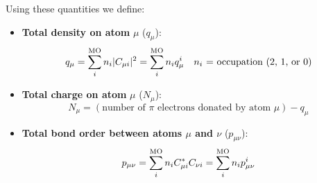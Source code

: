 \documentclass[../Main/chem532-notes.tex]{subfiles}
\begin{document}
%
%
%


Using these quantities we define:
\begin{itemize}
\item \textbf{Total density on atom} $\mu$ ($q_\mu$):
\begin{equation}
q_\mu = \sum_{i}^{\rm MO} n_i |C_{\mu i}|^2 = \sum_{i}^{\rm MO} n_i q_\mu^i \quad n_i \text{ = occupation (2, 1, or 0)} 
\end{equation}

\item \textbf{Total charge on atom} $\mu$ ($N_\mu$):
\begin{equation}
N_\mu = (\text{number of $\pi$ electrons donated by atom $\mu$}) - q_\mu
\end{equation}

\item \textbf{Total bond order between atoms  $\mu$ and  $\nu$} ($p_{\mu \nu}$):
\begin{equation}
p_{\mu \nu}= \sum_{i}^{\rm MO} n_i C_{\mu i}^* C_{\nu i} = \sum_{i}^{\rm MO} n_i p_{\mu\nu}^i
\end{equation}
\end{itemize}
\end{document}
